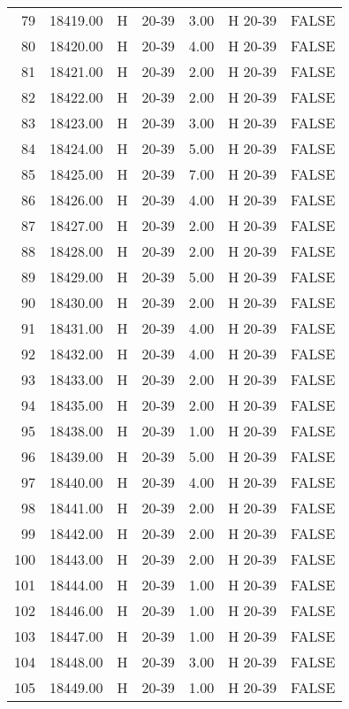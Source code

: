 \begin{table}[ht]
\begin{tabular}{rrllrll}
  79 & 18419.00 & H & 20-39 & 3.00 & H 20-39 & FALSE \\ 
  80 & 18420.00 & H & 20-39 & 4.00 & H 20-39 & FALSE \\ 
  81 & 18421.00 & H & 20-39 & 2.00 & H 20-39 & FALSE \\ 
  82 & 18422.00 & H & 20-39 & 2.00 & H 20-39 & FALSE \\ 
  83 & 18423.00 & H & 20-39 & 3.00 & H 20-39 & FALSE \\ 
  84 & 18424.00 & H & 20-39 & 5.00 & H 20-39 & FALSE \\ 
  85 & 18425.00 & H & 20-39 & 7.00 & H 20-39 & FALSE \\ 
  86 & 18426.00 & H & 20-39 & 4.00 & H 20-39 & FALSE \\ 
  87 & 18427.00 & H & 20-39 & 2.00 & H 20-39 & FALSE \\ 
  88 & 18428.00 & H & 20-39 & 2.00 & H 20-39 & FALSE \\ 
  89 & 18429.00 & H & 20-39 & 5.00 & H 20-39 & FALSE \\ 
  90 & 18430.00 & H & 20-39 & 2.00 & H 20-39 & FALSE \\ 
  91 & 18431.00 & H & 20-39 & 4.00 & H 20-39 & FALSE \\ 
  92 & 18432.00 & H & 20-39 & 4.00 & H 20-39 & FALSE \\ 
  93 & 18433.00 & H & 20-39 & 2.00 & H 20-39 & FALSE \\ 
  94 & 18435.00 & H & 20-39 & 2.00 & H 20-39 & FALSE \\ 
  95 & 18438.00 & H & 20-39 & 1.00 & H 20-39 & FALSE \\ 
  96 & 18439.00 & H & 20-39 & 5.00 & H 20-39 & FALSE \\ 
  97 & 18440.00 & H & 20-39 & 4.00 & H 20-39 & FALSE \\ 
  98 & 18441.00 & H & 20-39 & 2.00 & H 20-39 & FALSE \\ 
  99 & 18442.00 & H & 20-39 & 2.00 & H 20-39 & FALSE \\ 
  100 & 18443.00 & H & 20-39 & 2.00 & H 20-39 & FALSE \\ 
  101 & 18444.00 & H & 20-39 & 1.00 & H 20-39 & FALSE \\ 
  102 & 18446.00 & H & 20-39 & 1.00 & H 20-39 & FALSE \\ 
  103 & 18447.00 & H & 20-39 & 1.00 & H 20-39 & FALSE \\ 
  104 & 18448.00 & H & 20-39 & 3.00 & H 20-39 & FALSE \\ 
  105 & 18449.00 & H & 20-39 & 1.00 & H 20-39 & FALSE \\ 

\end{tabular}
\end{table}
